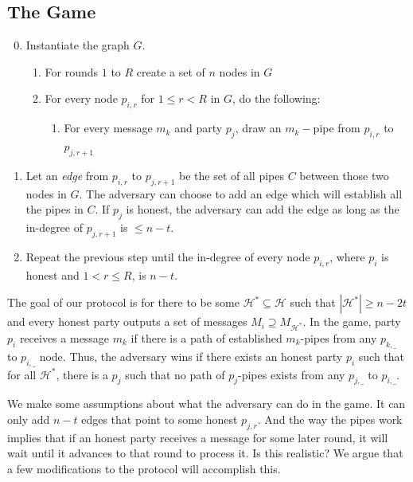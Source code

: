 \documentclass{article}
\begin{document}
\subsection{The Game}

\begin{enumerate}
    \setcounter{enumi}{-1}
    \item Instantiate the graph $G$. 
    \begin{enumerate}
        \item For rounds $1$ to $R$ create a set of $n$ nodes in $G$
        \item For every node $p_{i,r}$ for $1 \leq r < R$ in $G$, do the following:
        \begin{enumerate}
            \item For every message $m_k$ and party $p_j$, draw an $m_k-$pipe from $p_{i,r}$ to $p_{j,r+1}$
        \end{enumerate}
    \end{enumerate}
    
    \item Let an \emph{edge} from $p_{i,r}$ to $p_{j,r+1}$ be the set of all pipes $C$ between those two nodes in $G$. The adversary can choose to add an edge which will establish all the pipes in $C$. If $p_j$ is honest, the adversary can add the edge as long as the in-degree of $p_{j,r+1}$ is $\leq n-t$. 
    
    \item Repeat the previous step until the in-degree of every node $p_{i, r}$, where $p_i$ is honest and $1 < r \leq R$, is $n-t$.
    
\end{enumerate}

The goal of our protocol is for there to be some $\mathcal H^* \subseteq \mathcal H$ such that $|\mathcal H^*| \geq n - 2t$ and every honest party outputs a set of messages $M_i \supseteq M_{\mathcal H^*}$. In the game, party $p_i$ receives a message $m_k$ if there is a path of established $m_k$-pipes from any $p_{k, \_}$ to $p_{i, \_}$ node. Thus, the adversary wins if there exists an honest party $p_i$ such that for all $\mathcal H^*$, there is a $p_j$ such that no path of $p_j$-pipes exists from any $p_{j, \_}$ to $p_{i, \_}$.

We make some assumptions about what the adversary can do in the game. It can only add $n-t$ edges that point to some honest $p_{j, r}$. And the way the pipes work implies that if an honest party receives a message for some later round, it will wait until it advances to that round to process it. Is this realistic? We argue that a few modifications to the protocol will accomplish this. 
\end{document}
